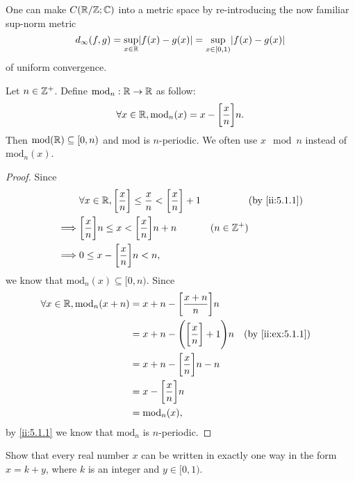 \begin{note}
  One can make \(C(\mathbb{R} / \mathbb{Z} ; \mathbb{C})\) into a metric space by re-introducing the now familiar sup-norm metric
  \[
    d_\infty(f, g) = \sup_{x \in \R} \abs{f(x) - g(x)} = \sup_{x \in [0, 1)} \abs{f(x) - g(x)}
  \]
  of uniform convergence.
\end{note}

\begin{ac}\label{ii:ac:5.1.1}
  Let \(n \in \mathbb{Z}^+\).
  Define \(\text{mod}_n : \mathbb{R} \to \mathbb{R}\) as follow:
  \[
    \forall x \in \mathbb{R}, \text{mod}_n(x) = x - \bigg[\dfrac{x}{n}\bigg] n.
  \]
  Then \(\text{mod}(\mathbb{R}) \subseteq [0, n)\) and \(\text{mod}\) is \(n\)-periodic.
  We often use \(x \mod n\) instead of \(\text{mod}_n(x)\).
\end{ac}

\begin{proof}
  Since
  \begin{align*}
             & \forall x \in \R, \bigg[\dfrac{x}{n}\bigg] \leq \dfrac{x}{n} < \bigg[\dfrac{x}{n}\bigg] + 1 &              & \by{ii:5.1.1} \\
    \implies & \bigg[\dfrac{x}{n}\bigg] n \leq x < \bigg[\dfrac{x}{n}\bigg] n + n                          & (n \in \Z^+)                 \\
    \implies & 0 \leq x - \bigg[\dfrac{x}{n}\bigg] n < n,
  \end{align*}
  we know that \(\text{mod}_n(x) \subseteq [0, n)\).
  Since
  \begin{align*}
    \forall x \in \R, \text{mod}_n(x + n) & = x + n - \bigg[\dfrac{x + n}{n}\bigg] n                                   \\
                                          & = x + n - \Bigg(\bigg[\dfrac{x}{n}\bigg] + 1\Bigg) n &  & \by{ii:ex:5.1.1} \\
                                          & = x + n - \bigg[\dfrac{x}{n}\bigg] n - n                                   \\
                                          & = x - \bigg[\dfrac{x}{n}\bigg] n                                           \\
                                          & = \text{mod}_n(x),
  \end{align*}
  by \cref{ii:5.1.1} we know that \(\text{mod}_n\) is \(n\)-periodic.
\end{proof}

\exercisesection

\begin{ex}\label{ii:ex:5.1.1}
  Show that every real number \(x\) can be written in exactly one way in the form \(x = k + y\), where \(k\) is an integer and \(y \in [0, 1)\).
\end{ex}


